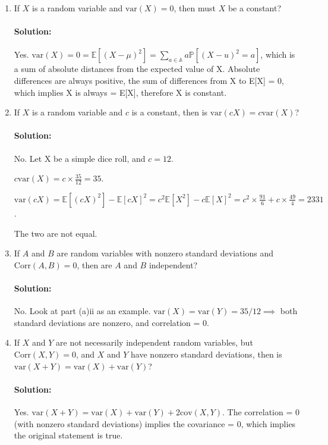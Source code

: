 \documentclass[11pt, notitlepage]{article}
\newcommand{\E}{\mathbb{E}}
\newcommand{\mP}{\mathbb{P}}
\newcommand{\var}{\text{var}}
\newcommand{\cov}{\text{cov}}
\newenvironment{solution}{\paragraph{Solution:}}{\hfill \vspace{10mm}}
\begin{document}
\begin{enumerate}[label=\alph*.)]
\begin{enumerate}[label=(\roman*)]
\begin{solution}
		Therefore, the two are not independent.
		\end{solution}

	\end{enumerate}
	
	\newpage
	
	For each of the problems below, if you think the answer is "yes" then provide a proof. If you think the answer is "no", then provide a counterexample.
	
	\item If $X$ is a random variable and $\var (X) = 0$, then must $X$ be a constant?
		\begin{solution} Yes. $\var (X) = 0=\E[(X-\mu)^2]=\sum_{a\in \mathbb{A}}a\mP[(X-u)^2=a]$, which is a sum of absolute distances from the expected value of X. Absolute differences are always positive, the sum of differences from X to E[X] = 0, which implies X is always = E[X], therefore X is constant.
			\end{solution}

	\item If $X$ is a random variable and $c$ is a constant, then is $\var (cX) = c \var (X)$?
		\begin{solution} No. Let X be a simple dice roll, and $c=12$.
		
		$c\var(X)=c \times \frac{35}{12}=35$.
		
		$\var(cX)=\E[(cX)^2]-\E[cX]^2=c^2\E[X^2]-c\E[X]^2=c^2\times\frac{91}{6}+c\times \frac{49}{4}=2331$.
		
		 The two are not equal.
		\end{solution}

	\item If $A$ and $B$ are random variables with nonzero standard deviations and $\text{Corr} (A, B) = 0$, then are $A$ and $B$ independent?
		\begin{solution} No. Look at part (a)ii as an example. $\var(X)=\var(Y)=35/12\implies$ both standard deviations are nonzero, and correlation = 0.
			\end{solution}

	\item If $X$ and $Y$ are not necessarily independent random variables, but $\text{Corr} (X, Y) = 0$, and $X$ and $Y$ have nonzero standard deviations, then is $\var (X+Y) = \var(X) + \var(Y)$?
		\begin{solution}
		Yes. $\var(X+Y)=\var(X)+\var(Y)+2\cov(X,Y)$. The correlation = 0 (with nonzero standard deviations) implies the covariance = 0, which implies the original statement is true.
		\end{solution}


\end{enumerate}
\end{document}
